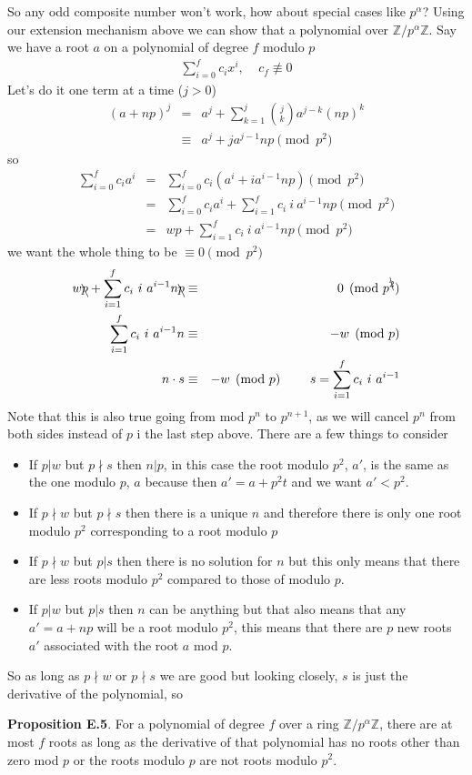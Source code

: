 \documentclass[aps,preprint,preprintnumbers,nofootinbib,showpacs,prd]{revtex4-1}
\newcommand{\bit}{\begin{itemize}}
\newcommand{\eit}{\end{itemize}}
\newcommand{\nbea}{\begin{eqnarray*}}
\newcommand{\neea}{\end{eqnarray*}}
\begin{document}
So any odd composite number won't work, how about special cases like $p^\alpha$? Using our extension mechanism above we can show that a polynomial over $\mathbb{Z}/p^\alpha\mathbb{Z}$. Say we have a root $a$ on a polynomial of degree $f$ modulo $p$
%
\nbea
\sum_{i = 0}^f c_i x^i, ~~~~~ c_f \not\equiv 0
\neea
%
Let's do it one term at a time ($j > 0$)
%
\nbea
(a + np)^j & = & a^j + \sum_{k=1}^{j} \binom{j}{k} a^{j-k}(np)^k \\
& \equiv & a^j + ja^{j-1}np \pmod{p^2}
\neea
%
so
%
\nbea
\sum_{i = 0}^f c_i a^i & = & \sum_{i = 0}^f c_i (a^i + ia^{i-1}np) \pmod{p^2} \\
& = & \sum_{i = 0}^f c_i a^i + \sum_{i = 1}^f c_i~ i~ a^{i-1}np \pmod{p^2} \\
& = & wp + \sum_{i = 1}^f c_i~ i~ a^{i-1}np \pmod{p^2}
\neea
%
we want the whole thing to be $\equiv 0 \pmod{p^2}$
%
\nbea
w\bcancel{p} + \sum_{i = 1}^f c_i~ i~ a^{i-1}n\bcancel{p} & \equiv & 0 \pmod{p^{\bcancel{2}}} \\
\sum_{i = 1}^f c_i~ i~ a^{i-1}n & \equiv & -w \pmod{p} \\
n \cdot s & \equiv & -w \pmod{p} ~~~~~~~ s = \sum_{i = 1}^f c_i~ i~ a^{i-1}
\neea
%
Note that this is also true going from mod $p^n$ to $p^{n+1}$, as we will cancel $p^n$ from both sides instead of $p$ i the last step above. There are a few things to consider
%
\bit
%
\item If $p|w$ but $p\nmid s$ then $n|p$, in this case the root modulo $p^2$, $a'$, is the same as the one modulo $p$, $a$ because then $a' = a + p^2t$ and we want $a' < p^2$.
%
\item If $p\nmid w$ but $p\nmid s$ then there is a unique $n$ and therefore there is only one root modulo $p^2$ corresponding to a root modulo $p$
%
\item If $p\nmid w$ but $p|s$ then there is no solution for $n$ but this only means that there are less roots modulo $p^2$ compared to those of modulo $p$.
%
\item If $p|w$ but $p|s$ then $n$ can be anything but that also means that any $a' = a + np$ will be a root modulo $p^2$, this means that there are $p$ new roots $a'$ associated with the root $a$ mod $p$.
%
\eit
%
So as long as $p\nmid w$ or $p\nmid s$ we are good but looking closely, $s$ is just the derivative of the polynomial, so 

{\bf Proposition E.5}. For a polynomial of degree $f$ over a ring $\mathbb{Z}/p^\alpha\mathbb{Z}$, there are at most $f$ roots as long as the derivative of that polynomial has no roots other than zero mod $p$ or the roots modulo $p$ are not roots modulo $p^2$.
\end{document}
